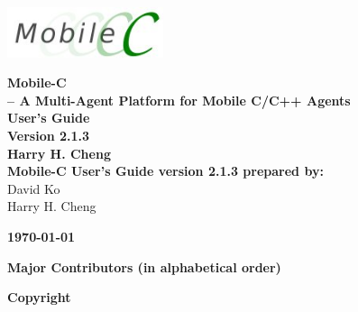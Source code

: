 \documentclass[11pt]{report}
\begin{document}
\thispagestyle{empty}
\begin{center}
\includegraphics[width=1.8in]{figure/mobilec_logo.png}


\vspace{0.5in}
{\Huge\sf\bf Mobile-C} \\
\vspace{0.1in}
{\LARGE\sf\bf -- A Multi-Agent Platform for Mobile C/C++ Agents} \\
\vspace{0.4in}
{\LARGE\sf\bf User's Guide} \\
\vspace{0.4in}
{\LARGE\sf\bf Version 2.1.3} \\
\vspace{1.0in}
{\Large\sf\bf Harry H. Cheng} \\
\vspace{1.0in}
{\large\sf\bf Mobile-C User's Guide version 2.1.3 prepared by:} \\
\vspace{0.2in}
David Ko\\
Harry H. Cheng
\vspace{1in}

\vspace{2.0in}
{\large\sf\bf\today}
\end{center}

\pagebreak
\noindent
{\LARGE\sf\bf Major Contributors (in alphabetical order)} \\
{\small

}
\pagebreak


\thispagestyle{empty}
\noindent
{\Large\bf Copyright}\\


\pagebreak
\end{document}
